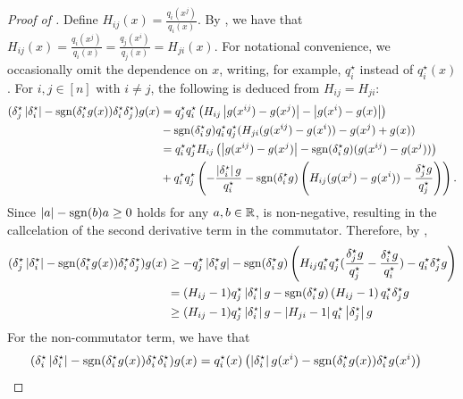 \begin{proof}[Proof of ]
    Define $H_{ij}(x) = \frac{q_i(x^j)}{q_i(x)}$.
    By , we have that $H_{ij}(x) = \frac{q_i(x^j)}{q_i(x)} = \frac{q_j(x^i)}{q_j(x)} = H_{ji}(x)$.
    For notational convenience, we occasionally omit the dependence on $x$, writing, for example, $q_i^\star$ instead of $q_i^\star(x)$.
    For $i,j\in[n]$ with $i\neq j$, the following is deduced from $H_{ij}=H_{ji}$:
    \begin{align}
        (\delta_j^\star \left\vert\delta_i^\star\right\vert - \mathrm{sgn}(\delta^\star_i g(x))\delta_i^\star \delta_j^\star) g(x)
        &=  q_j^\star q_i^\star\left(H_{ij}\left\vert g(x^{ij}) - g(x^j)\right\vert - \left\vert g(x^i) - g(x)\right\vert\right) \nonumber
        \\&- \mathrm{sgn}(\delta^\star_i g) q_i^\star q_j^\star(H_{ji}(g(x^{ij})-g(x^i)) - g(x^j)+g(x))\nonumber
        \\&=q_i^\star q_j^\star H_{ij}\left(\left\vert g(x^{ij}) - g(x^j)\right\vert - \mathrm{sgn}(\delta^\star_i g)(g(x^{ij}) - g(x^j))\right) \label{eq:abs-commutator_second_term}
        \\&+q_i^\star q_j^\star\left(-\frac{\left\vert\delta^\star_i\right\vert g}{q_i^\star} - \mathrm{sgn}(\delta^\star_i g)\left(H_{ij}(g(x^j) - g(x^i)) - \frac{\delta^\star_jg}{q_j^\star}\right)\right). \label{eq:abs-commutator_eq}
    \end{align}
    Since $\left\vert a\right\vert-\mathrm{sgn}(b)a \geq 0$ holds for any $a,b\in\mathbb{R}$,  is non-negative, resulting in the callcelation of the second derivative term in the commutator.
    Therefore, by , 
    \begin{align}
        (\delta_j^\star \left\vert\delta_i^\star\right\vert - \mathrm{sgn}(\delta^\star_i g(x))\delta_i^\star \delta_j^\star) g(x)
        &\geq - q_j^\star\left\vert\delta^\star_i g\right\vert - \mathrm{sgn}(\delta^\star_i g)\left(H_{ij}q_i^\star q_j^\star(\frac{\delta_j^\star g}{q_j^\star} - \frac{\delta_i^\star g}{q_i^\star}) - q_i^\star\delta^\star_jg\right) \nonumber
        \\&= (H_{ij} - 1)q_j^\star\left\vert\delta^\star_i\right\vert g - \mathrm{sgn}(\delta^\star_i g) \left(H_{ij} - 1\right)q_i^\star\delta^\star_j g \nonumber
        \\&\geq (H_{ij} - 1)q_j^\star\left\vert\delta^\star_i\right\vert g - \left\vert H_{ji} - 1\right\vert q_i^\star\left\vert\delta^\star_j\right\vert g \label{eq:CSGE_commutator_term}
    \end{align}
    For the non-commutator term, we have that
    \begin{align} \label{eq:CSGE_non-commutator_term}
        (\delta_i^\star \abs{\delta_i^\star} - \sgn(\delta^\star_i g(x))\delta_i^\star \delta_i^\star)g(x) &= q_i^\star(x) \tp{\abs{\delta_i^\star}g(x^i) - \sgn(\delta^\star_i g(x))\delta_i^\star g(x^i)} \nonumber

\end{align}
\end{proof}
